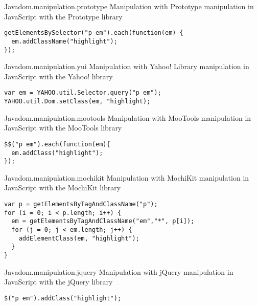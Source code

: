 \removeline

\begin{scode}{Java}{dom.manipulation.prototype}{%
   Manipulation with Prototype}{%
   manipulation in JavaScript with the Prototype library}
\begin{lstlisting}
getElementsBySelector("p em").each(function(em) {
  em.addClassName("highlight");
});
\end{lstlisting}
\end{scode}

\begin{scode}{Java}{dom.manipulation.yui}{%
   Manipulation with Yahoo!  Library}{%
   manipulation in JavaScript with the Yahoo!  library}
\begin{lstlisting}
var em = YAHOO.util.Selector.query("p em"); 
YAHOO.util.Dom.setClass(em, "highlight);
\end{lstlisting}
\end{scode}

\begin{scode}{Java}{dom.manipulation.mootools}{%
   Manipulation with MooTools}{%
   manipulation in JavaScript with the MooTools library}
\begin{lstlisting}
$$("p em").each(function(em){
  em.addClass("highlight");
});
\end{lstlisting}
\end{scode}

\begin{scode}{Java}{dom.manipulation.mochikit}{%
   Manipulation with MochiKit}{%
   manipulation in JavaScript with the MochiKit library}
\begin{lstlisting}
var p = getElementsByTagAndClassName("p");
for (i = 0; i < p.length; i++) {
  em = getElementsByTagAndClassName("em","*", p[i]);
  for (j = 0; j < em.length; j++) {
    addElementClass(em, "highlight");
  }
}
\end{lstlisting}
\end{scode}

\begin{scode}{Java}{dom.manipulation.jquery}{%
   Manipulation with jQuery}{%
   manipulation in JavaScript with the jQuery library}
\begin{lstlisting}
$("p em").addClass("highlight");
\end{lstlisting}
\end{scode}

